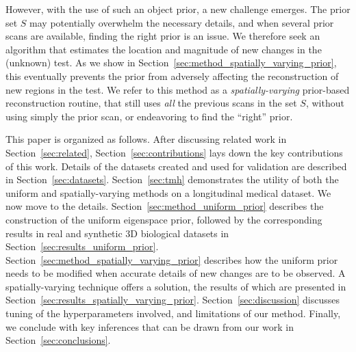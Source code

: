 \documentclass[journal]{IEEEtran}
\begin{document}
 However, with the use of such an object prior, a new challenge
 emerges. The prior set $S$ may potentially overwhelm the necessary
 details, and when several prior scans are available, finding the
 right prior is an issue. We therefore seek an algorithm that
 estimates the location and magnitude of new changes in the
 (unknown) test. As we show in
 Section~\ref{sec:method_spatially_varying_prior}, this eventually
 prevents the prior from adversely affecting the reconstruction of new
 regions in the test. We refer to this method as a
 \textit{spatially-varying} prior-based reconstruction routine, that
 still uses \textit{all} the previous scans in the set $S$, without
 using simply the prior scan, or endeavoring to find the ``right''
 prior.

 This paper is organized as follows. After discussing related work in
 Section~\ref{sec:related}, Section~\ref{sec:contributions} lays down
 the key contributions of this work. Details of the datasets created and
 used for validation
 are described in Section~\ref{sec:datasets}. Section~\ref{sec:tmh}
 demonstrates the utility of both the uniform and spatially-varying
 methods on a longitudinal medical dataset. We now move to the
 details. Section~\ref{sec:method_uniform_prior} describes the
 construction of the uniform eigenspace prior, followed by the
 corresponding results in real and synthetic 3D biological datasets in
 Section~\ref{sec:results_uniform_prior}. Section~\ref{sec:method_spatially_varying_prior}
 describes how the uniform prior needs to be modified when accurate
 details of new changes are to be observed. A spatially-varying
 technique offers a solution, the results of which are presented in
 Section~\ref{sec:results_spatially_varying_prior}. Section~\ref{sec:discussion}
 discusses tuning of the hyperparameters involved, and limitations of
 our method. Finally, we conclude with key inferences that can be
 drawn from our work in Section~\ref{sec:conclusions}.
 
\end{document}
